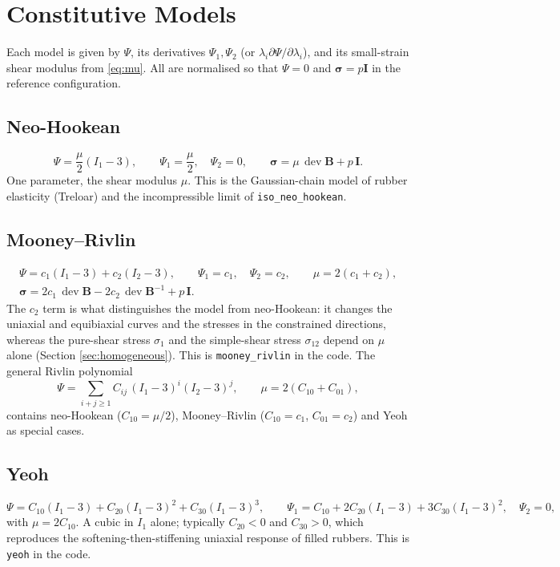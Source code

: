 \documentclass[11pt]{article}
\newcommand{\dev}{\operatorname{dev}}
\newcommand{\bsig}{\bm{\sigma}}
\newcommand{\bB}{\bm{B}}
\newcommand{\bI}{\bm{I}}
\newcommand{\Ione}{I_1}
\newcommand{\Itwo}{I_2}
\newcommand{\Pone}{\Psi_{1}}
\newcommand{\Ptwo}{\Psi_{2}}
\newcommand{\code}[1]{{\frenchspacing\texttt{#1}}}
\begin{document}
\section{Constitutive Models}

Each model is given by $\Psi$, its derivatives $\Pone,\Ptwo$ (or
$\lambda_i\partial\Psi/\partial\lambda_i$), and its small-strain shear
modulus from \eqref{eq:mu}.  All are normalised so that $\Psi = 0$ and
$\bsig = p\bI$ in the reference configuration.

\subsection{Neo-Hookean}
\begin{equation}
  \Psi = \frac{\mu}{2}(\Ione - 3), \qquad
  \Pone = \frac{\mu}{2}, \quad \Ptwo = 0, \qquad
  \bsig = \mu\,\dev\bB + p\,\bI .
\end{equation}
One parameter, the shear modulus $\mu$.  This is the Gaussian-chain model of
rubber elasticity (Treloar) and the incompressible limit of
\code{iso\_neo\_hookean}.

\subsection{Mooney--Rivlin}
\begin{gather}
  \Psi = c_1(\Ione - 3) + c_2(\Itwo - 3), \qquad
  \Pone = c_1, \quad \Ptwo = c_2, \qquad \mu = 2(c_1 + c_2), \\
  \bsig = 2c_1\,\dev\bB - 2c_2\,\dev\bB^{-1} + p\,\bI .
\end{gather}
The $c_2$ term is what distinguishes the model from neo-Hookean: it
changes the uniaxial and equibiaxial curves and the stresses in the
constrained directions, whereas the pure-shear stress $\sigma_1$ and the
simple-shear stress $\sigma_{12}$ depend on $\mu$ alone (Section
\ref{sec:homogeneous}).  This is \code{mooney\_rivlin} in the code.  The general Rivlin polynomial
\begin{equation}
  \Psi = \sum_{i+j \ge 1} C_{ij}\,(\Ione - 3)^i(\Itwo - 3)^j,
  \qquad \mu = 2(C_{10} + C_{01}),
\end{equation}
contains neo-Hookean ($C_{10} = \mu/2$), Mooney--Rivlin
($C_{10} = c_1$, $C_{01} = c_2$) and Yeoh as special cases.

\subsection{Yeoh}
\begin{equation}
  \Psi = C_{10}(\Ione - 3) + C_{20}(\Ione - 3)^2 + C_{30}(\Ione - 3)^3, \qquad
  \Pone = C_{10} + 2C_{20}(\Ione - 3) + 3C_{30}(\Ione - 3)^2, \quad \Ptwo = 0,
\end{equation}
with $\mu = 2C_{10}$.  A cubic in $\Ione$ alone; typically $C_{20} < 0$ and
$C_{30} > 0$, which reproduces the softening-then-stiffening uniaxial
response of filled rubbers.  This is \code{yeoh} in the code.
\end{document}
